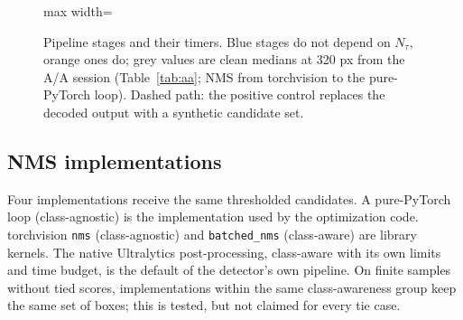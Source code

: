 \documentclass[a4paper,fleqn]{cas-dc}
\newcommand{\Ntau}{N_{\tau}}
\begin{document}
\begin{figure}[pos=!t]
\begin{adjustbox}{max width=\textwidth}
\end{adjustbox}
\caption{Pipeline stages and their timers. Blue stages do not depend on $\Ntau$, orange ones do; grey values are clean medians at 320 px from the A/A session (Table~\ref{tab:aa}; NMS from torchvision to the pure-PyTorch loop). Dashed path: the positive control replaces the decoded output with a synthetic candidate set.}
\label{fig:pipeline}
\end{figure}

\subsection{NMS implementations}
Four implementations receive the same thresholded candidates. A pure-PyTorch loop (class-agnostic) is the implementation used by the optimization code. torchvision \texttt{nms} (class-agnostic) and \texttt{batched\_nms} (class-aware) are library kernels. The native Ultralytics post-processing, class-aware with its own limits and time budget, is the default of the detector's own pipeline. On finite samples without tied scores, implementations within the same class-awareness group keep the same set of boxes; this is tested, but not claimed for every tie case.
\end{document}

